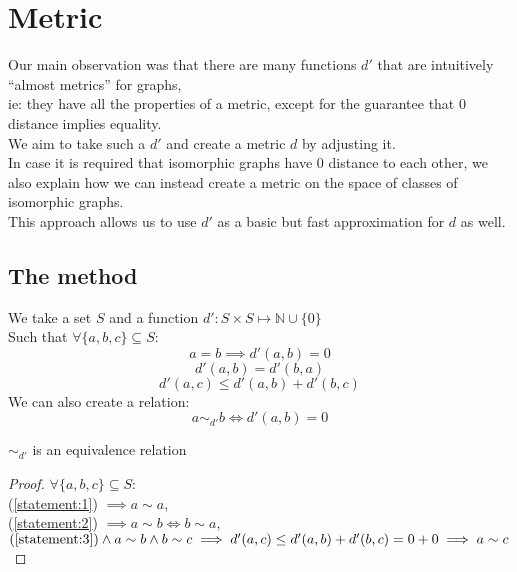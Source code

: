 \section{Metric}
Our main observation was that there are many functions $d'$ that are intuitively ``almost metrics'' for graphs,\\
ie: they have all the properties of a metric, except for the guarantee that 0 distance implies equality. \\
We aim to take such a $d'$ and create a metric $d$ by adjusting it. \\
In case it is required that isomorphic graphs have 0 distance to each other, we also explain how we can instead create a metric on the space of classes of isomorphic graphs. \\
This approach allows us to use $d'$ as a basic but fast approximation for $d$ as well.

\subsection{The method}
	We take a set $S$ and a function $d'\colon S \times S \mapsto \mathbb{N} \cup \{0\}$ \\
	Such that $\forall \{a, b, c\} \subseteq S$: \\
	\begin{equation} \label{statement:1}
		a = b \implies d'(a, b)=0
	\end{equation}
	\begin{equation} \label{statement:2}
		d'(a, b) = d'(b, a)
	\end{equation}
	\begin{equation} \label{statement:3}
		d'(a, c) \leq d'(a, b) + d'(b, c)
	\end{equation}
	We can also create a relation:
	\[a\sim_{d'}b \iff d'(a, b)=0\]
	
	\begin{proposition}
		$\sim_{d'}$ is an equivalence relation
	\end{proposition}
	\begin{proof} $\forall \{a, b, c\} \subseteq S$: \\
		(\ref{statement:1}) $\implies a \sim a$, \\
		(\ref{statement:2}) $\implies a \sim b \iff b \sim a$, \\
		$(\ref{statement:3}) \land a \sim b \land b \sim c
		\implies d'(a, c) \leq d'(a,b) + d'(b, c) = 0 + 0 \implies a \sim c $ \\
	\end{proof}
	
